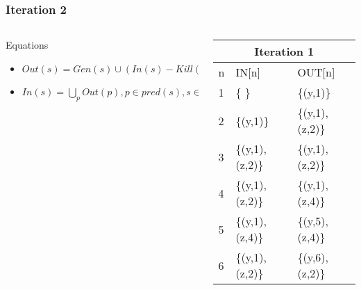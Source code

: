 \begin{frame}[fragile, t]
	\frametitle{Iteration 2} 
	
	\vspace{-1cm}
	
	\begin{columns}[T]
		\begin{column}[T]{.6\textwidth}
	\begin{center}
		\begin{scriptsize}
			\begin{minipage}{8cm}
				\begin{block}{Equations}
					\begin{itemize}
						\item $Out(s) = Gen(s) \cup (In(s) - Kill(s))$  
						\item $In(s) = \bigcup_p Out(p), p \in pred(s), s \in stmts$
					\end{itemize}
				\end{block}
			\end{minipage}
		\end{scriptsize}
	\end{center}
\end{column}
\begin{column}[T]{.4\textwidth}
	\begin{tiny}
		   \begin{table}[]
		\begin{tabular}{|l|l|l|}
			\hline			
			\multicolumn{3}{|c|}{Iteration 1}\\
			\hline
			n & IN{[}n{]} & OUT{[}n{]} \\ \hline
			1  & \{ \}            & \{(y,1)\} \\ \hline
			2  & \{(y,1)\}        & \{(y,1), (z,2)\} \\ \hline
			3  & \{(y,1), (z,2)\} & \{(y,1), (z,2)\} \\ \hline
			4  & \{(y,1), (z,2)\} & \{(y,1), (z,4)\} \\ \hline
			5  & \{(y,1), (z,4)\} & \{(y,5), (z,4)\} \\ \hline
			6  & \{(y,1), (z,2)\} & \{(y,6), (z,2)\} \\ \hline
		\end{tabular}
	\end{table}   
\end{tiny}
\end{column}
	\end{columns}
	

\end{frame}

